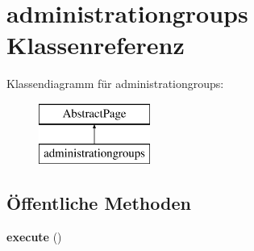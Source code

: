 \hypertarget{classadministrationgroups}{}\section{administrationgroups Klassenreferenz}
\label{classadministrationgroups}
Klassendiagramm für administrationgroups\+:\begin{figure}[H]
\begin{center}
\leavevmode
\includegraphics[height=2.000000cm]{classadministrationgroups}
\end{center}
\end{figure}
\subsection*{Öffentliche Methoden}
\begin{DoxyCompactItemize}
\item 
\mbox{\label{classadministrationgroups_a7e11a1f06eda4fc826c53ba6b80a3711}} 
{\bfseries execute} ()
\end{DoxyCompactItemize}
